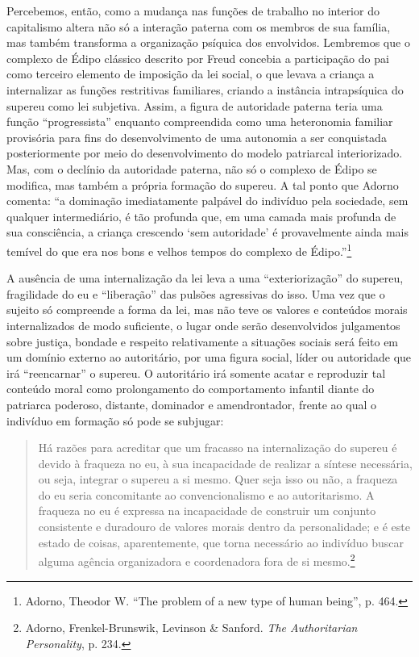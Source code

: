 Percebemos, então, como a mudança nas funções de trabalho no interior do
capitalismo altera não só a interação paterna com os membros de sua
família, mas também transforma a organização psíquica dos envolvidos.
Lembremos que o complexo de Édipo clássico descrito por Freud concebia a
participação do pai como terceiro elemento de imposição da lei social, o
que levava a criança a internalizar as funções restritivas familiares,
criando a instância intrapsíquica do supereu como lei subjetiva. Assim,
a figura de autoridade paterna teria uma função ``progressista''
enquanto compreendida como uma heteronomia familiar provisória para fins
do desenvolvimento de uma autonomia a ser conquistada posteriormente por
meio do desenvolvimento do modelo patriarcal interiorizado. Mas, com o
declínio da autoridade paterna, não só o complexo de Édipo se modifica,
mas também a própria formação do supereu. A tal ponto que Adorno
comenta: ``a dominação
imediatamente palpável do indivíduo pela sociedade, sem qualquer
intermediário, é tão profunda que, em uma camada mais profunda de sua
consciência, a criança crescendo `sem autoridade' é provavelmente ainda
mais temível do que era nos bons e velhos tempos do complexo de
Édipo.''\footnote{Adorno, Theodor W. ``The problem of a new type of
  human being'', p. 464.}

A ausência de uma internalização da lei leva a uma ``exteriorização'' do
supereu, fragilidade do eu e ``liberação'' das pulsões agressivas do
isso. Uma vez que o sujeito só compreende a forma da lei, mas não teve
os valores e conteúdos morais internalizados de modo suficiente, o lugar
onde serão desenvolvidos julgamentos sobre justiça, bondade e respeito
relativamente a situações sociais será feito em um domínio externo ao
autoritário, por uma figura social, líder ou autoridade que irá
``reencarnar'' o supereu. O autoritário irá somente acatar e reproduzir
tal conteúdo moral como prolongamento do comportamento infantil diante
do patriarca poderoso, distante, dominador e amendrontador, frente ao
qual o indivíduo em formação só pode se subjugar:

\begin{quote}
Há razões para acreditar que um fracasso na internalização do supereu é
devido à fraqueza no eu, à sua incapacidade de realizar a síntese
necessária, ou seja, integrar o supereu a si mesmo. Quer seja isso ou
não, a fraqueza do eu seria concomitante ao convencionalismo e ao
autoritarismo. A fraqueza no eu é expressa na incapacidade de construir
um conjunto consistente e duradouro de valores morais dentro da
personalidade; e é este estado de coisas, aparentemente, que torna
necessário ao indivíduo buscar alguma agência organizadora e
coordenadora fora de si mesmo.\footnote{Adorno, Frenkel-Brunswik,
  Levinson \& Sanford. \emph{The Authoritarian Personality}, p. 234.}
\end{quote}


